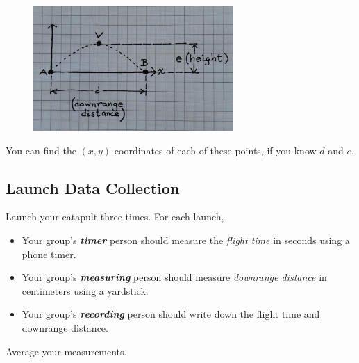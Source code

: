\begin{figure}
\centering
\includegraphics[width=3in]{../AVB.jpg}
\label{fig:AVB}
\end{figure}

You can find the $(x, y)$ coordinates of each of these points, 
if you know $d$ and $e$.





\subsection{Launch Data Collection}

Launch your catapult three times.
For each launch,
\begin{itemize}[nosep]
    \item Your group's {\bfseries\itshape timer} person should 
        measure the {\itshape flight time} 
        in seconds using a phone timer.
    \item Your group's {\bfseries\itshape measuring} person should 
        measure {\itshape downrange distance} 
        in centimeters using a yardstick.
    \item Your group's {\bfseries\itshape recording} person should 
        write down the flight time and downrange distance.
\end{itemize}

Average your measurements.

